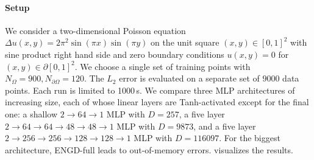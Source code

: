 \paragraph{Setup} We consider a two-dimensional Poisson equation $\Delta u(x, y) = 2 \pi^2 \sin(\pi x) \sin(\pi y)$ on the unit square $(x,y) \in [0, 1]^2$ with sine product right hand side and zero boundary conditions $u(x, y) = 0$ for $(x,y) \in \partial [0,1]^2$.
We choose a single set of training points with $N_{\Omega} = 900, N_{\partial\Omega} = 120$.
The $L_2$ error is evaluated on a separate set of $\num{9000}$ data points.
Each run is limited to 1000\,s.
We compare three MLP architectures of increasing size, each of whose linear layers are Tanh-activated except for the final one: a shallow $2\to 64\to 1$ MLP with $D=257$, a five layer $2 \to 64 \to 64 \to 48 \to 48 \to 1$ MLP with $D=\num{9873}$, and a five layer $2 \to 256 \to 256\to 128 \to 128 \to 1$ MLP with $D=\num{116097}$.
For the biggest architecture, ENGD-full leads to out-of-memory errors.
 visualizes the results.

